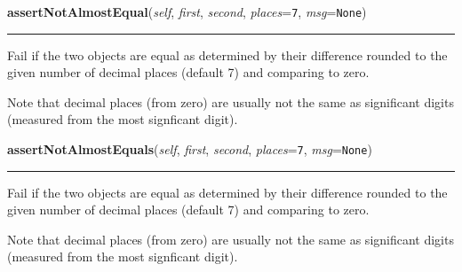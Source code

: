     \label{unittest:TestCase:failIfAlmostEqual}

    \vspace{0.5ex}

    \begin{boxedminipage}{\textwidth}

    \raggedright \textbf{assertNotAlmostEqual}(\textit{self}, \textit{first}, \textit{second}, \textit{places}=\texttt{7}, \textit{msg}=\texttt{None})

    \vspace{-1.5ex}

    \rule{\textwidth}{0.5\fboxrule}
    Fail if the two objects are equal as determined by their difference 
    rounded to the given number of decimal places (default 7) and comparing
    to zero.

    Note that decimal places (from zero) are usually not the same as 
    significant digits (measured from the most signficant digit).

    \vspace{1ex}

    \end{boxedminipage}

    \label{unittest:TestCase:failIfAlmostEqual}

    \vspace{0.5ex}

    \begin{boxedminipage}{\textwidth}

    \raggedright \textbf{assertNotAlmostEquals}(\textit{self}, \textit{first}, \textit{second}, \textit{places}=\texttt{7}, \textit{msg}=\texttt{None})

    \vspace{-1.5ex}

    \rule{\textwidth}{0.5\fboxrule}
    Fail if the two objects are equal as determined by their difference 
    rounded to the given number of decimal places (default 7) and comparing
    to zero.

    Note that decimal places (from zero) are usually not the same as 
    significant digits (measured from the most signficant digit).

    \vspace{1ex}

    \end{boxedminipage}

    \label{unittest:TestCase:failIfEqual}

